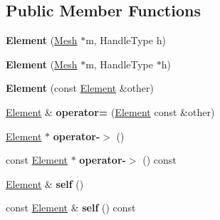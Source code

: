 \subsection*{Public Member Functions}
\begin{DoxyCompactItemize}
\item 
\hypertarget{classINMOST_1_1Element_ad436acce5c638e2dba1092b6714d272b}{{\bfseries Element} (\hyperlink{classINMOST_1_1Mesh}{Mesh} $\ast$m, Handle\-Type h)}\label{classINMOST_1_1Element_ad436acce5c638e2dba1092b6714d272b}

\item 
\hypertarget{classINMOST_1_1Element_a479a64825cc451349225ff1a6e541d3c}{{\bfseries Element} (\hyperlink{classINMOST_1_1Mesh}{Mesh} $\ast$m, Handle\-Type $\ast$h)}\label{classINMOST_1_1Element_a479a64825cc451349225ff1a6e541d3c}

\item 
\hypertarget{classINMOST_1_1Element_a2d5ef13759950d36b16aeea99f729812}{{\bfseries Element} (const \hyperlink{classINMOST_1_1Element}{Element} \&other)}\label{classINMOST_1_1Element_a2d5ef13759950d36b16aeea99f729812}

\item 
\hypertarget{classINMOST_1_1Element_a8761a37c3bc9f46ada8f09034e8fa3a7}{\hyperlink{classINMOST_1_1Element}{Element} \& {\bfseries operator=} (\hyperlink{classINMOST_1_1Element}{Element} const \&other)}\label{classINMOST_1_1Element_a8761a37c3bc9f46ada8f09034e8fa3a7}

\item 
\hypertarget{classINMOST_1_1Element_a912fb247d1bdfbd0eb6e562a1ededd6f}{\hyperlink{classINMOST_1_1Element}{Element} $\ast$ {\bfseries operator-\/$>$} ()}\label{classINMOST_1_1Element_a912fb247d1bdfbd0eb6e562a1ededd6f}

\item 
\hypertarget{classINMOST_1_1Element_a5487af4d6ea1854a2864fae18a6932b5}{const \hyperlink{classINMOST_1_1Element}{Element} $\ast$ {\bfseries operator-\/$>$} () const }\label{classINMOST_1_1Element_a5487af4d6ea1854a2864fae18a6932b5}

\item 
\hypertarget{classINMOST_1_1Element_a2c3df3226d74ae023da7989a193acf9f}{\hyperlink{classINMOST_1_1Element}{Element} \& {\bfseries self} ()}\label{classINMOST_1_1Element_a2c3df3226d74ae023da7989a193acf9f}

\item 
\hypertarget{classINMOST_1_1Element_ab50141ec6c8da76fdd9771eed4a3c70e}{const \hyperlink{classINMOST_1_1Element}{Element} \& {\bfseries self} () const }\label{classINMOST_1_1Element_ab50141ec6c8da76fdd9771eed4a3c70e}


\end{DoxyCompactItemize}
